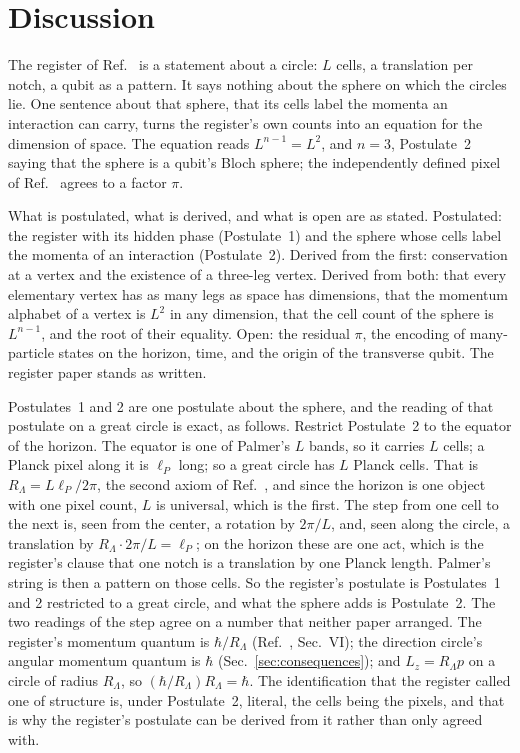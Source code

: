 \documentclass[aps,prd,twocolumn,superscriptaddress,nofootinbib]{revtex4-2}
\begin{document}
\section{Discussion}
\label{sec:discussion}

The register of Ref.~\cite{korytko2026c} is a statement about a circle: $L$ cells, a translation per notch, a qubit as a pattern. It says nothing about the sphere on which the circles lie. One sentence about that sphere, that its cells label the momenta an interaction can carry, turns the register's own counts into an equation for the dimension of space. The equation reads $L^{n-1} = L^2$, and $n = 3$, Postulate~2 saying that the sphere is a qubit's Bloch sphere; the independently defined pixel of Ref.~\cite{korytko2026} agrees to a factor $\pi$.

What is postulated, what is derived, and what is open are as stated. Postulated: the register with its hidden phase (Postulate~1) and the sphere whose cells label the momenta of an interaction (Postulate~2). Derived from the first: conservation at a vertex and the existence of a three-leg vertex. Derived from both: that every elementary vertex has as many legs as space has dimensions, that the momentum alphabet of a vertex is $L^2$ in any dimension, that the cell count of the sphere is $L^{n-1}$, and the root of their equality. Open: the residual $\pi$, the encoding of many-particle states on the horizon, time, and the origin of the transverse qubit. The register paper stands as written.

Postulates~1 and 2 are one postulate about the sphere, and the reading of that postulate on a great circle is exact, as follows. Restrict Postulate~2 to the equator of the horizon. The equator is one of Palmer's $L$ bands, so it carries $L$ cells; a Planck pixel along it is $\ell_P$ long; so a great circle has $L$ Planck cells. That is $R_\Lambda = L\ell_P/2\pi$, the second axiom of Ref.~\cite{korytko2026}, and since the horizon is one object with one pixel count, $L$ is universal, which is the first. The step from one cell to the next is, seen from the center, a rotation by $2\pi/L$, and, seen along the circle, a translation by $R_\Lambda\cdot2\pi/L = \ell_P$; on the horizon these are one act, which is the register's clause that one notch is a translation by one Planck length. Palmer's string is then a pattern on those cells. So the register's postulate is Postulates~1 and 2 restricted to a great circle, and what the sphere adds is Postulate~2. The two readings of the step agree on a number that neither paper arranged. The register's momentum quantum is $\hbar/R_\Lambda$ (Ref.~\cite{korytko2026c}, Sec.~VI); the direction circle's angular momentum quantum is $\hbar$ (Sec.~\ref{sec:consequences}); and $L_z = R_\Lambda p$ on a circle of radius $R_\Lambda$, so $(\hbar/R_\Lambda)R_\Lambda = \hbar$. The identification that the register called one of structure is, under Postulate~2, literal, the cells being the pixels, and that is why the register's postulate can be derived from it rather than only agreed with.
\end{document}
